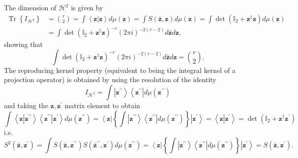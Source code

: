 \documentclass[aps,preprint]{revtex4}%
\begin{document}
The dimension of $\mathcal{H}^{2}$ is given by
\begin{align}
\operatorname*{Tr}\left\{  I_{\mathcal{H}^{2}}\right\}   &  =\binom{r}{2}%
=\int\left\langle \mathbf{z}\left\vert \mathbf{z}\right.  \right\rangle
d\mu\left(  \mathbf{z}\right)  =\int S\left(  \mathbf{\bar{z},z}\right)
d\mu\left(  \mathbf{z}\right)  =\int\det\left(  \mathbb{I}_{2}+\mathbf{z}%
^{\dagger}\mathbf{z}\right)  d\mu\left(  \mathbf{z}\right)  \nonumber\\
&  =\int\det\left(  \mathbb{I}_{2}+\mathbf{z}^{\dagger}\mathbf{z}\right)
^{-r}\left(  2\pi i\right)  ^{-2\left(  r-2\right)  }d\mathbf{\bar{z}%
}d\mathbf{z,}%
\end{align}
showing that
\begin{equation}
\int\det\left(  \mathbb{I}_{2}+\mathbf{z}^{\dagger}\mathbf{z}\right)
^{-r}\left(  2\pi i\right)  ^{-2\left(  r-2\right)  }d\mathbf{\bar{z}%
}d\mathbf{z}=\binom{r}{2}.
\end{equation}
The reproducing kernel property (equivalent to being the integral kernel of a
projection operator) is obtained by using the resolution of the identity
\begin{equation}
I_{\mathcal{H}^{2}}=\int\left\vert \mathbf{z}^{\prime\prime}\right\rangle
\left\langle \mathbf{z}^{\prime\prime}\right\vert d\mu\left(  \mathbf{z}%
^{\prime\prime}\right)
\end{equation}
and taking the $\mathbf{z,z}^{\prime}$ matrix element to obtain
\begin{equation}
\int\left\langle \mathbf{z}\left\vert \mathbf{z}^{\prime\prime}\right.
\right\rangle \left\langle \mathbf{z}^{\prime\prime}\left\vert \mathbf{z}%
^{\prime}\right.  \right\rangle d\mu\left(  \mathbf{z}^{\prime\prime}\right)
=\left\langle \mathbf{z}\right\vert \left\{  \int\left\vert \mathbf{z}%
^{\prime\prime}\right\rangle \left\langle \mathbf{z}^{\prime\prime}\right\vert
d\mu\left(  \mathbf{z}^{\prime\prime}\right)  \right\}  \left\vert
\mathbf{z}^{\prime}\right\rangle =\left\langle \mathbf{z}\left\vert
\mathbf{z}^{\prime}\right.  \right\rangle =\det\left(  \mathbb{I}%
_{2}+\mathbf{z}^{\dagger}\mathbf{z}^{\prime}\right)
\end{equation}
i.e.
\begin{equation}
S^{2}\left(  \mathbf{\bar{z}},\mathbf{z}^{\prime}\right)  =\int S\left(
\mathbf{\bar{z},z}^{\prime\prime}\right)  S\left(  \mathbf{\bar{z}}%
^{\prime\prime},\mathbf{z}^{\prime}\right)  d\mu\left(  \mathbf{z}%
^{\prime\prime}\right)  =\left\langle \mathbf{z}\right\vert \left\{
\int\left\vert \mathbf{z}^{\prime\prime}\right\rangle \left\langle
\mathbf{z}^{\prime\prime}\right\vert d\mu\left(  \mathbf{z}^{\prime\prime
}\right)  \right\}  \left\vert \mathbf{z}^{\prime}\right\rangle =S\left(
\mathbf{\bar{z}},\mathbf{z}^{\prime}\right)  .
\end{equation}
\end{document}
